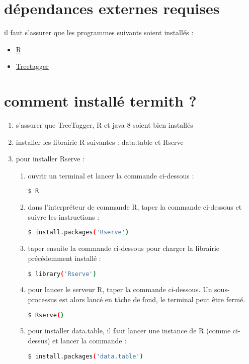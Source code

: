 \section{dépendances externes requises}

il faut s'assurer que les programmes suivants soient installés :
\begin{itemize}
  \item \href{http://www.jason-french.com/blog/2013/03/11/installing-r-in-linux/}{R}
  \item \href{http://www.cis.uni-muenchen.de/~schmid/tools/TreeTagger/}{Treetagger}
\end{itemize}

\section{comment installé termith ?}

\begin{enumerate}
  \item s'assurer que TreeTagger, R et java 8 soient bien installés
  \item installer les librairie R suivantes : data.table et Rserve
  \item pour installer Rserve :
    \begin{enumerate}
      \item ouvrir un terminal et lancer la commande ci-dessous :
      \begin{lstlisting}[language=bash]
      $ R
      \end{lstlisting}
      \item dans l'interpréteur de commande R, taper la commande ci-dessous et suivre les instructions :
      \begin{lstlisting}[language=bash]
      $ install.packages('Rserve')
      \end{lstlisting}
      \item taper ensuite la commande ci-dessous pour charger la librairie précédemment installé :
      \begin{lstlisting}[language=bash]
      $ library('Rserve')
      \end{lstlisting}
      \item pour lancer le serveur R, taper la commande ci-dessous. Un sous-processus est alors lancé en tâche de fond, le terminal peut être fermé.
      \begin{lstlisting}[language=bash]
      $ Rserve()
      \end{lstlisting}
      \item pour installer data.table, il faut lancer une instance de R (comme ci-dessus) et lancer la commande :
      \begin{lstlisting}[language=bash]
      $ install.packages('data.table')
      \end{lstlisting}
    \end{enumerate}
\end{enumerate}
